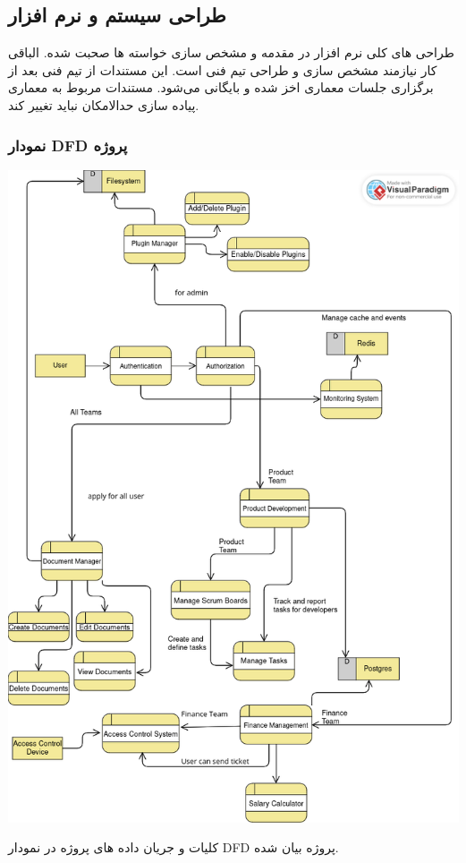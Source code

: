 \subsection{طراحی سیستم و نرم افزار}
طراحی های کلی نرم افزار در مقدمه و مشخص سازی خواسته ها صحبت شده. الباقی کار نیازمند مشخص سازی و طراحی تیم فنی است. این مستندات از تیم فنی بعد از 
برگزاری جلسات معماری اخز شده و بایگانی می‌شود.
مستندات مربوط به معماری پیاده سازی حدالامکان نباید تغییر کند.

\subsubsection{نمودار DFD پروژه}

\includegraphics[scale=0.55]{assets/main_dfd.png}

کلیات و جریان داده های پروژه در نمودار DFD پروژه بیان شده.


